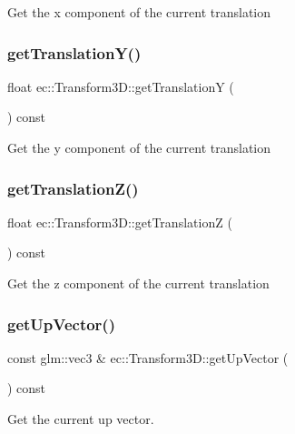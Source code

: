Get the x component of the current translation \mbox{\label{classec_1_1_transform3_d_a18d2aca82a3b8944815801963f32ab8c}} 
\subsubsection{\texorpdfstring{get\+Translation\+Y()}{getTranslationY()}}
{\footnotesize\ttfamily float ec\+::\+Transform3\+D\+::get\+TranslationY (\begin{DoxyParamCaption}{ }\end{DoxyParamCaption}) const}

Get the y component of the current translation \mbox{\label{classec_1_1_transform3_d_a5d7ec019acf68cb930db1a7db79ef97f}} 
\subsubsection{\texorpdfstring{get\+Translation\+Z()}{getTranslationZ()}}
{\footnotesize\ttfamily float ec\+::\+Transform3\+D\+::get\+TranslationZ (\begin{DoxyParamCaption}{ }\end{DoxyParamCaption}) const}

Get the z component of the current translation \mbox{\label{classec_1_1_transform3_d_af8bdfb3bbc688a9a920ccb4d452d8962}} 
\subsubsection{\texorpdfstring{get\+Up\+Vector()}{getUpVector()}}
{\footnotesize\ttfamily const glm\+::vec3 \& ec\+::\+Transform3\+D\+::get\+Up\+Vector (\begin{DoxyParamCaption}{ }\end{DoxyParamCaption}) const}

Get the current up vector. \mbox{\label{classec_1_1_transform3_d_a24885ce6a9f002a00f7c263e4076ea6b}} 
